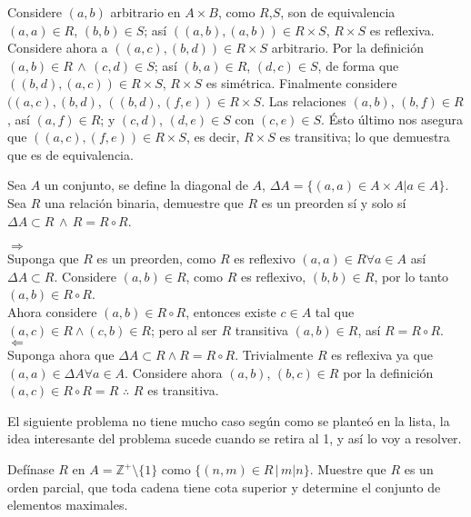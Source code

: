 \begin{sol}
    Considere $(a,b)$ arbitrario en $A \times B$, como $R$,$S$, son de
    equivalencia $(a,a) \in R$, $(b,b)\in S$; así $((a,b),(a,b))\in R \times
    S$, $R \times S$ es reflexiva. Considere ahora a $((a,c),(b,d))\in
    R\times S$ arbitrario. Por la definición $(a,b) \in R \, \land \, (c,d)
    \in S$; así $(b,a) \in R$, $(d,c) \in S$, de forma que $((b,d),(a,c))
    \in R \times S$, $R \times S$ es simétrica. Finalmente considere
    $((a,c),(b,d)$, $((b,d), (f,e)) \in R \times S$. Las relaciones
    $(a,b)$, $(b,f) \in R$, así $(a,f) \in R$; y $(c,d)$, $(d,e) \in S$ con
    $(c,e) \in S$. Ésto último nos asegura que $((a,c),(f,e))\in R \times
    S$, es decir, $R \times S$ es transitiva; lo que demuestra que es de
    equivalencia.
\end{sol}
\begin{problem}
    Sea $A$ un conjunto, se define la diagonal de $A$, $\Delta A = \{(a,a)
    \in A \times A | a \in A\}$. Sea $R$ una relación binaria, demuestre que
    $R$ es un preorden sí y solo sí $\Delta A \subset R \, \land \, R =
    R\circ R $.
\end{problem}
\begin{sol}
    $\Rightarrow$ \\
    Suponga que $R$ es un preorden, como $R$ es reflexivo $(a,a)\in R
    \forall a \in A$ así $\Delta A \subset R$. Considere $(a,b) \in R$, como
    $R$ es reflexivo, $(b,b) \in R$, por lo tanto $(a,b) \in R \circ R$. \\
    Ahora considere $(a,b) \in R \circ R$, entonces existe $c \in A$ tal que 
    $(a,c)\in R \land (c,b) \in R$; pero al ser $R$ transitiva $(a,b) \in
    R$, así $R=R\circ R$.\\
    $\Leftarrow$ \\
    Suponga ahora que $\Delta A \subset R \land R = R \circ R$. Trivialmente
    $R$ es reflexiva ya que $(a,a) \in \Delta A \forall a \in A$. Considere
    ahora $(a,b)$, $(b,c) \in R$ por la definición $(a,c) \in R \circ R = R$
    $\therefore$ $R$ es transitiva.
\end{sol}
\begin{remark}
    El siguiente problema no tiene mucho caso según como se planteó en la
    lista, la idea interesante del problema sucede cuando se retira al 1, y
    así lo voy a resolver.
\end{remark}
\begin{problem}
    Defínase $R$ en $A=\mathbb{Z}^{+}\setminus\{1\}$ como $\{(n,m) \in R \, | \, m | n\}$.
    Muestre que $R$ es un orden parcial, que toda cadena tiene cota superior
    y determine el conjunto de elementos maximales. 
\end{problem}
